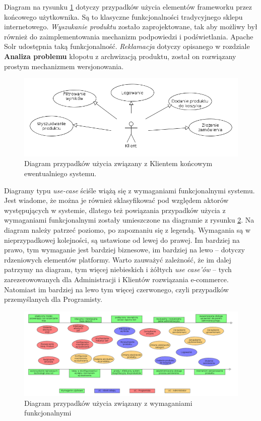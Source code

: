 Diagram na rysunku \ref{useCaseCustomer} dotyczy przypadków użycia elementów frameworku przez końcowego użytkownika. Są to klasyczne funkcjonalności tradycyjnego sklepu internetowego. \textit{Wyszukanie produktu} zostało zaprojektowane, tak aby możliwy był również do zaimplementowania mechanizm podpowiedzi i podświetlania. Apache Solr udostępnia taką funkcjonalność. \textit{Reklamacja} dotyczy opisanego w rozdziale \textbf{Analiza problemu} kłopotu z archwizacją produktu, został on rozwiązany prostym mechanizmem wersjonowania. 
\begin{figure}
	\begin{center}
		\includegraphics[width=1\textwidth]{uccustomer.png}
	\end{center}
	\caption{{\color{black}Diagram przypadków użycia związany z Klientem końcowym ewentualniego systemu.}} \label{useCaseCustomer}
\end{figure}

Diagramy typu \textit{use-case} ściśle wiążą się z wymaganiami funkcjonalnymi systemu. Jest wiadome, że można je również sklasyfikować pod względem aktorów występujących w systemie, dlatego też powiązania przypadków użycia z wymaganiami funkcjonalnymi zostały umieszczone na diagramie z rysunku \ref{wymtoUC}. Na diagram należy patrzeć poziomo, po zapoznaniu się z legendą. Wymagania są w nieprzypadkowej kolejności, są ustawione od lewej do prawej. Im bardziej na prawo, tym wymaganie jest bardziej biznesowe, im bardziej na lewo -- dotyczy rdzeniowych elementów platformy. Warto zauważyć zależność, że im dalej patrzymy na diagram, tym więcej niebieskich i żółtych \textit{use case'ów} -- tych zarezerowowanych dla Administracji i Klientów rozwiązania e-commerce. Natomiast im bardziej na lewo tym więcej czerwonego, czyli przypadków przemyślanych dla Programisty.
\begin{figure}
	\begin{center}
		\includegraphics[angle=270,scale=0.4]{wymToUC.png}
	\end{center}
	\caption{{\color{black}Diagram przypadków użycia związany z wymaganiami funkcjonalnymi}} \label{wymtoUC}
\end{figure}


